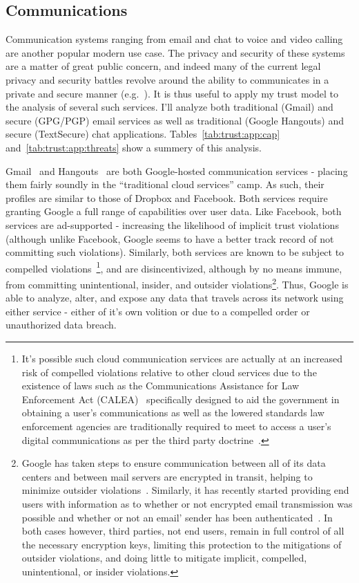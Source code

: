 \subsection{Communications}

Communication systems ranging from email and chat to voice and video
calling are another popular modern use case. The privacy and security
of these systems are a matter of great public concern, and indeed many
of the current legal privacy and security battles revolve around the
ability to communicates in a private and secure manner
(e.g.~\cite{apple-fbiletter, greenwald-prism, levsion-lavabit}). It is
thus useful to apply my trust model to the analysis of several such
services. I'll analyze both traditional (Gmail) and secure (GPG/PGP)
email services as well as traditional (Google Hangouts) and secure
(TextSecure) chat applications. Tables~\ref{tab:trust:app:cap}
and~\ref{tab:trust:app:threats} show a summery of this analysis.

Gmail~\cite{google-gmail} and Hangouts~\cite{google-hangouts} are both
Google-hosted communication services - placing them fairly soundly in
the ``traditional cloud services'' camp. As such, their profiles are
similar to those of Dropbox and Facebook. Both services require
granting Google a full range of capabilities over user data. Like
Facebook, both services are ad-supported - increasing the likelihood
of implicit trust violations (although unlike Facebook, Google seems
to have a better track record of not committing such
violations). Similarly, both services are known to be subject to
compelled violations~\cite{google-transparency}\footnote{It's possible
  such cloud communication services are actually at an increased risk
  of compelled violations relative to other cloud services due to the
  existence of laws such as the Communications Assistance for Law
  Enforcement Act (CALEA)~\cite{calea-usc, calea-fcc} specifically
  designed to aid the government in obtaining a user's communications
  as well as the lowered standards law enforcement agencies are
  traditionally required to meet to access a user's digital
  communications as per the third party
  doctrine~\cite{scotus-usvmiller, scotus-smithvmaryland}.}, and are
disincentivized, although by no means immune, from committing
unintentional, insider, and outsider violations\footnote{Google has
  taken steps to ensure communication between all of its data centers
  and between mail servers are encrypted in transit, helping to
  minimize outsider
  violations~\cite{gmail-blog-encryption}. Similarly, it has recently
  started providing end users with information as to whether or not
  encrypted email transmission was possible and whether or not an
  email' sender has been authenticated~\cite{gmail-blog-indicators}.
  In both cases however, third parties, not end users, remain in full
  control of all the necessary encryption keys, limiting this
  protection to the mitigations of outsider violations, and doing
  little to mitigate implicit, compelled, unintentional, or insider
  violations.}. Thus, Google is able to analyze, alter, and expose any
data that travels across its network using either service - either of
it's own volition or due to a compelled order or unauthorized data
breach.

